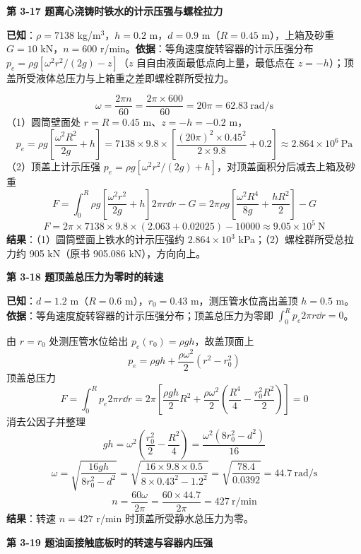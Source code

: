\noindent\textbf{第 3-17 题\quad 离心浇铸时铁水的计示压强与螺栓拉力}

\begin{jie}
\textbf{已知}：$\rho=7138$ kg/m$^3$，$h=0.2$ m，$d=0.9$ m（$R=0.45$ m），上箱及砂重 $G=10$ kN，$n=600$ r/min。\textbf{依据}：等角速度旋转容器的计示压强分布 $p_e=\rho g\left[\omega^2r^2/(2g)-z\right]$（$z$ 自自由液面最低点向上量，最低点在 $z=-h$）；顶盖所受液体总压力与上箱重之差即螺栓群所受拉力。

\[ \omega=\frac{2\pi n}{60}=\frac{2\pi\times600}{60}=20\pi=62.83\ \mathrm{rad/s} \]
（1）圆筒壁面处 $r=R=0.45$ m、$z=-h=-0.2$ m，
\[ p_e=\rho g\left[\frac{\omega^2R^2}{2g}+h\right]=7138\times9.8\times\left[\frac{(20\pi)^2\times0.45^2}{2\times9.8}+0.2\right]\approx2.864\times10^6\ \mathrm{Pa} \]
（2）顶盖上计示压强 $p_e=\rho g\left[\omega^2r^2/(2g)+h\right]$，对顶盖面积分后减去上箱及砂重
\[ F=\int_0^{R}\rho g\left[\frac{\omega^2r^2}{2g}+h\right]2\pi r\dd r-G=2\pi\rho g\left[\frac{\omega^2R^4}{8g}+\frac{hR^2}{2}\right]-G \]
\[ F=2\pi\times7138\times9.8\times(2.063+0.02025)-10000\approx9.05\times10^5\ \mathrm{N} \]
\textbf{结果}：（1）圆筒壁面上铁水的计示压强约 $2.864\times10^3$ kPa；（2）螺栓群所受总拉力约 905 kN（原书 905.086 kN），方向向上。
\end{jie}

\noindent\textbf{第 3-18 题\quad 顶盖总压力为零时的转速}

\begin{jie}
\textbf{已知}：$d=1.2$ m（$R=0.6$ m），$r_0=0.43$ m，测压管水位高出盖顶 $h=0.5$ m。\textbf{依据}：等角速度旋转容器的计示压强分布；顶盖总压力为零即 $\int_0^{R}p_e2\pi r\dd r=0$。

由 $r=r_0$ 处测压管水位给出 $p_e(r_0)=\rho gh$，故盖顶面上
\[ p_e=\rho gh+\frac{\rho\omega^2}{2}(r^2-r_0^2) \]
顶盖总压力
\[ F=\int_0^{R}p_e2\pi r\dd r=2\pi\left[\frac{\rho gh}{2}R^2+\frac{\rho\omega^2}{2}\left(\frac{R^4}{4}-\frac{r_0^2R^2}{2}\right)\right]=0 \]
消去公因子并整理
\[ gh=\omega^2\left(\frac{r_0^2}{2}-\frac{R^2}{4}\right)=\frac{\omega^2(8r_0^2-d^2)}{16} \]
\[ \omega=\sqrt{\frac{16gh}{8r_0^2-d^2}}=\sqrt{\frac{16\times9.8\times0.5}{8\times0.43^2-1.2^2}}=\sqrt{\frac{78.4}{0.0392}}=44.7\ \mathrm{rad/s} \]
\[ n=\frac{60\omega}{2\pi}=\frac{60\times44.7}{2\pi}=427\ \mathrm{r/min} \]
\textbf{结果}：转速 $n=427$ r/min 时顶盖所受静水总压力为零。
\end{jie}

\noindent\textbf{第 3-19 题\quad 油面接触底板时的转速与容器内压强}

